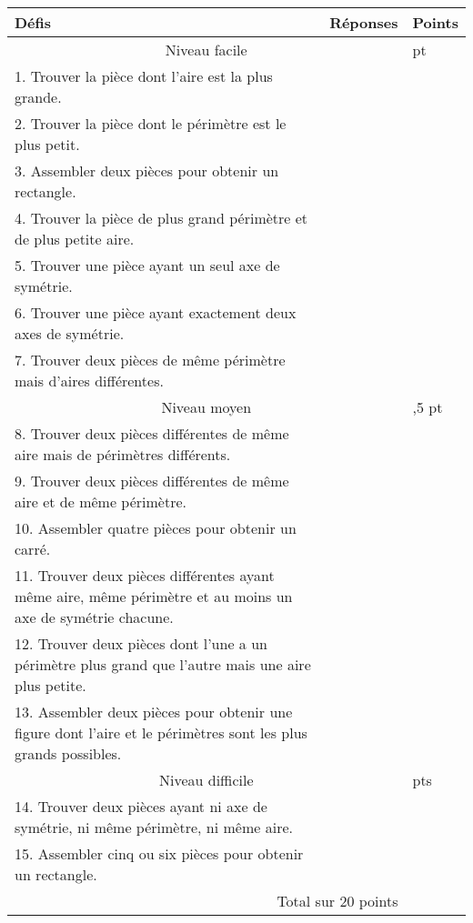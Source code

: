 \begin{enigme}
    {\renewcommand{\arraystretch}{1.75}
    \begin{tabular}{|p{11cm}|>{\centering\arraybackslash}p{3cm}|>{\centering\arraybackslash}p{1cm}|}
    \hline
    Défis & Réponses & Points \\
    \hline
    \multicolumn{2}{|c|}{Niveau facile} & 1 pt \\
    \hline
    1. Trouver la pièce dont l'aire est la plus grande. & & \\
    \hline
    2. Trouver la pièce dont le périmètre est le plus petit. & & \\
    \hline
    3. Assembler deux pièces pour obtenir un rectangle. & & \\
    \hline
    4. Trouver la pièce de plus grand périmètre et de plus petite aire. & & \\
    \hline
    5. Trouver une pièce ayant un seul axe de symétrie. & & \\
    \hline
    6. Trouver une pièce ayant exactement deux axes de symétrie. & & \\
    \hline
    7. Trouver deux pièces de même périmètre mais d'aires différentes. & & \\
    \hline
    \hline
    \multicolumn{2}{|c|}{Niveau moyen} & 1,5 pt \\
    \hline
    8. Trouver deux pièces différentes de même aire mais de périmètres différents. & & \\
    \hline
    9. Trouver deux pièces différentes de même aire et de même périmètre. & & \\
    \hline
    10. Assembler quatre pièces pour obtenir un carré. & & \\
    \hline
    11. Trouver deux pièces différentes ayant même aire, même périmètre et au moins un axe de symétrie chacune. & & \\
    \hline
    12. Trouver deux pièces dont l'une a un périmètre plus grand que l'autre mais une aire plus petite. & & \\
    \hline
    13. Assembler deux pièces pour obtenir une figure dont l'aire et le périmètres sont les plus grands possibles. & & \\
    \hline
    \hline
    \multicolumn{2}{|c|}{Niveau difficile} & 2 pts \\
    \hline
    14. Trouver deux pièces ayant ni axe de symétrie, ni même périmètre, ni même aire. & & \\
    \hline
    15. Assembler cinq ou six pièces pour obtenir un rectangle. & & \\
    \hline
    \hline
    \multicolumn{2}{|r|}{Total sur 20 points} & \\
    \hline
    \end{tabular}}
\end{enigme}  
%     

